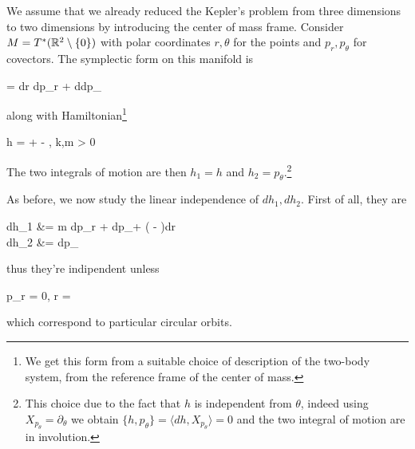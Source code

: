 \documentclass[main.tex]{subfiles}
\begin{document}
\begin{example}
	We assume that we already reduced the Kepler's problem from three dimensions to two dimensions by introducing the center of mass frame. Consider $M= T^*(\mathbb{R}^2 \setminus \{0\})$ with polar coordinates $r, \theta$ for the points and $p_r, p_\theta$ for covectors. The symplectic form on this manifold is
	\begin{eqalign}
		\omega = dr \wedge dp_r + d\theta \wedge dp_\theta
	\end{eqalign}
	along with Hamiltonian\footnote{We get this form from a suitable choice of description of the two-body system, from the reference frame of the center of mass.}
	\begin{eqalign}
		h =  +  - , \quad k,m > 0
	\end{eqalign}
	The two integrals of motion are then $h_1=h$ and $h_2 = p_\theta$.\footnote{This choice due to the fact that $h$ is independent from $\theta$, indeed using $X_{p_\theta} = \partial_\theta$ we obtain $\{h, p_\theta\} = \langle dh, X_{p_\theta} \rangle = 0$ and the two integral of motion are in involution.}

	As before, we now study the linear independence of $dh_1, dh_2$. First of all, they are
	\begin{eqalign}
		dh_1 &= m dp_r + dp_\theta + \left(  -  \right)dr\\
		dh_2 &= dp_\theta
	\end{eqalign}
	thus they're indipendent unless
	\begin{eqalign}
		p_r = 0, \quad r = \frac{p_\theta^2}{mk}
	\end{eqalign}
	which correspond to particular circular orbits.


\end{example}
\end{document}
